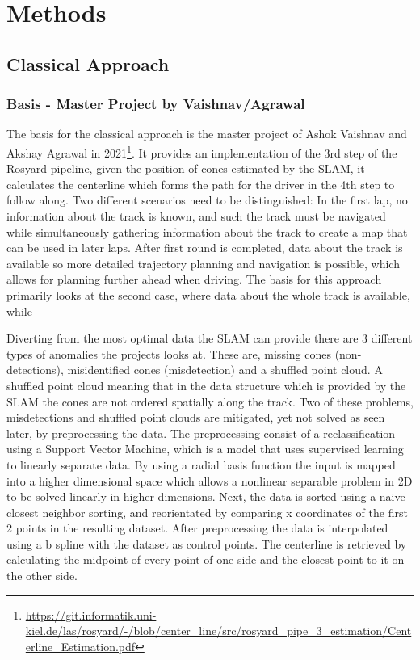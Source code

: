 \graphicspath{{Chapter/Figs/methods/}}
\chapter{Methods}


\section{Classical Approach}

\subsection{Basis - Master Project by Vaishnav/Agrawal}
The basis for the classical approach is the master project of Ashok Vaishnav and Akshay Agrawal in 2021\footnote{\url{https://git.informatik.uni-kiel.de/las/rosyard/-/blob/center_line/src/rosyard_pipe_3_estimation/Centerline_Estimation.pdf}}.
It provides an implementation of the 3rd step of the Rosyard pipeline, given the position of cones estimated by the SLAM, it calculates the centerline which forms the path for the driver in the 4th step to follow along.
Two different scenarios need to be distinguished: In the first lap, no information about the track is known, and such the track must be navigated while simultaneously gathering information about the track to create a map that can be used in later laps. After first round is completed, data about the track is available so more detailed trajectory planning and navigation is possible, which allows for planning further ahead when driving. The basis for this approach primarily looks at the second case, where data about the whole track is available, while 

Diverting from the most optimal data the SLAM can provide there are 3 different types of anomalies the projects looks at. These are, missing cones (non-detections), misidentified cones (misdetection) and a shuffled point cloud. A shuffled point cloud meaning that in the data structure which is provided by the SLAM the cones are not ordered spatially along the track. Two of these problems, misdetections and shuffled point clouds are mitigated, yet not solved as seen later, by preprocessing the data. The preprocessing consist of a reclassification using a Support Vector Machine\cite{cortes1995}, which is a model that uses supervised learning to linearly separate data. By using a radial basis function the input is mapped into a higher dimensional space which allows a nonlinear separable problem in 2D to be solved linearly in higher dimensions. Next, the data is sorted using a naive closest neighbor sorting, and reorientated by comparing x coordinates of the first 2 points in the resulting dataset. After preprocessing the data is interpolated using a b spline with the dataset as control points. The centerline is retrieved by calculating the midpoint of every point of one side and the closest point to it on the other side.

